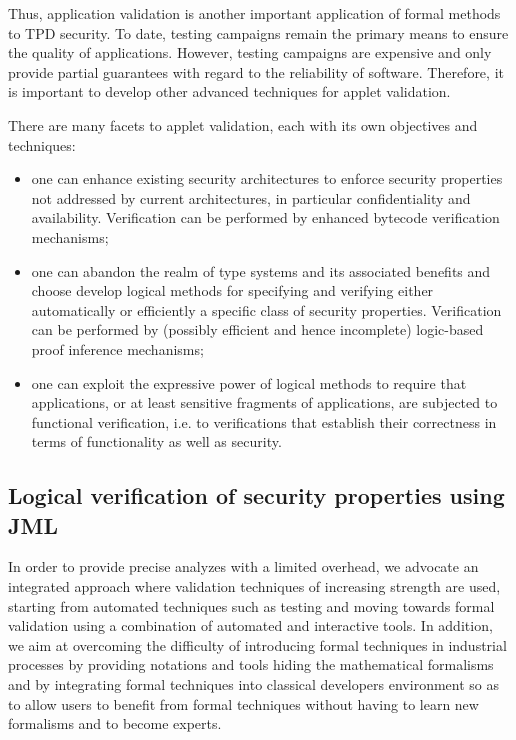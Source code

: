 Thus, application validation is another important application of
formal methods to TPD security. To date, testing campaigns remain the
primary means to ensure the quality of applications. However, testing
campaigns are expensive and only provide partial guarantees with
regard to the reliability of software. Therefore, it is important to
develop other advanced techniques for applet validation.

There are many facets to applet validation, each with its own
objectives and techniques:
\begin{itemize}
\item one can enhance existing security architectures to enforce
security properties not addressed by current architectures, in
particular confidentiality and availability.  Verification can be
performed by enhanced bytecode verification mechanisms;


\item one can abandon the realm of type systems and its associated
benefits and choose develop logical methods for specifying and
verifying either automatically or efficiently a specific class of
security properties. Verification can be performed by (possibly
efficient and hence incomplete) logic-based proof inference
mechanisms;




\item one can exploit the expressive power of logical methods to
require that applications, or at least sensitive fragments of
applications, are subjected to functional verification, i.e. to
verifications that establish their correctness in terms of
functionality as well as security.
\end{itemize}



\subsection{Logical verification of security properties using JML}
In order to provide precise analyzes with a limited overhead, we
advocate an integrated approach where validation techniques of
increasing strength are used, starting from automated techniques such
as testing and moving towards formal validation using a combination of
automated and interactive tools. In addition, we aim at overcoming the
difficulty of introducing formal techniques in industrial processes by
providing notations and tools hiding the mathematical formalisms and
by integrating formal techniques into classical developers environment
so as to allow users to benefit from formal techniques without having
to learn new formalisms and to become experts.

